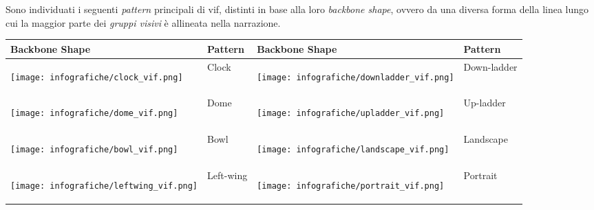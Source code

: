 Sono individuati i seguenti \emph{pattern} principali di \gls{vif}, distinti in base alla loro \emph{backbone shape}, ovvero da una diversa forma della linea lungo cui la 
maggior parte dei \emph{gruppi visivi} è allineata nella narrazione.
\begin{table}[H]
    \centering
    \begin{tabular}{|>{\centering\arraybackslash} m{}| >{\centering\arraybackslash} m{}| >{\centering\arraybackslash} m{}| >{\centering\arraybackslash} m{}|}
        \hline
        \rowcolor{gray!30}
        \textbf{Backbone Shape} & \textbf{Pattern} & \textbf{Backbone Shape} & \textbf{Pattern} \\
        \hline
        \begin{center}\texttt{[image: infografiche/clock\_vif.png]}\end{center} & Clock 
        & \begin{center}\texttt{[image: infografiche/downladder\_vif.png]}\end{center} & Down-ladder \\
        \begin{center}\texttt{[image: infografiche/dome\_vif.png]}\end{center} & Dome
        & \begin{center}\texttt{[image: infografiche/upladder\_vif.png]}\end{center} & Up-ladder \\
        \begin{center}\texttt{[image: infografiche/bowl\_vif.png]}\end{center} & Bowl
        & \begin{center}\texttt{[image: infografiche/landscape\_vif.png]}\end{center} & Landscape \\
        \begin{center}\texttt{[image: infografiche/leftwing\_vif.png]}\end{center} & Left-wing 
        & \begin{center}\texttt{[image: infografiche/portrait\_vif.png]}\end{center} & Portrait \\

\end{tabular}
\end{table}

